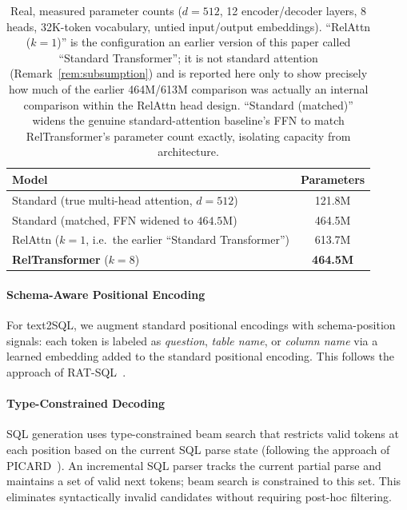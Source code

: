 \documentclass[review]{elsarticle}
\begin{document}
\begin{table}[t]
\centering
\caption{Real, measured parameter counts ($d{=}512$, 12 encoder/decoder layers, 8 heads, 32K-token vocabulary, untied input/output embeddings). ``RelAttn ($k{=}1$)'' is the configuration an earlier version of this paper called ``Standard Transformer''; it is not standard attention (Remark~\ref{rem:subsumption}) and is reported here only to show precisely how much of the earlier 464M/613M comparison was actually an internal comparison within the RelAttn head design. ``Standard (matched)'' widens the genuine standard-attention baseline's FFN to match RelTransformer's parameter count exactly, isolating capacity from architecture.}
\label{tab:param_reality}
\begin{tabular}{lc}
\toprule
\textbf{Model} & \textbf{Parameters} \\
\midrule
Standard (true multi-head attention, $d{=}512$) & 121.8M \\
Standard (matched, FFN widened to $464.5$M) & 464.5M \\
RelAttn ($k{=}1$, i.e.\ the earlier ``Standard Transformer'') & 613.7M \\
\textbf{RelTransformer} ($k{=}8$) & \textbf{464.5M} \\
\bottomrule
\end{tabular}
\end{table}

\paragraph{Schema-Aware Positional Encoding}
For text2SQL, we augment standard positional encodings with schema-position signals: each token is labeled as \textit{question}, \textit{table name}, or \textit{column name} via a learned embedding added to the standard positional encoding. This follows the approach of RAT-SQL~\cite{wang2020ratsql}.

\paragraph{Type-Constrained Decoding}
SQL generation uses type-constrained beam search that restricts valid tokens at each position based on the current SQL parse state (following the approach of PICARD~\cite{scholak2021picard}). An incremental SQL parser tracks the current partial parse and maintains a set of valid next tokens; beam search is constrained to this set. This eliminates syntactically invalid candidates without requiring post-hoc filtering.
\end{document}
